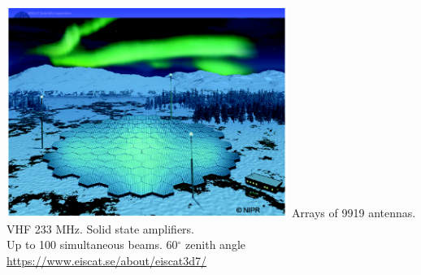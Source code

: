 \begin{frame}[fragile,t]
\frametitle{\hfill}
\vspace{0.1in}
\begin{center}
\includegraphics[height=2.7in]{eiscat_3d_array.png}
\vfill
    {\colblack Arrays of 9919 antennas. VHF 233 MHz. Solid state amplifiers.\\Up to 100 simultaneous beams. 60$^\circ$ zenith angle}
    {\small \url{https://www.eiscat.se/about/eiscat3d7/}}
\end{center}
\end{frame}

